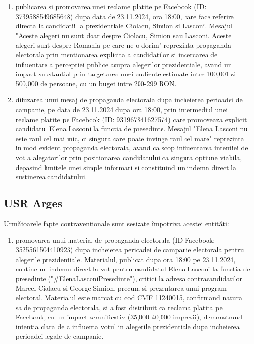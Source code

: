 \documentclass[a4paper,12pt]{article}
\begin{document}
\begin{enumerate}[leftmargin=*, label=\arabic*.)]
    \item publicarea si promovarea unei reclame platite pe Facebook (ID: \href{https://www.facebook.com/ads/library/?id=3739588549685648}{3739588549685648}) dupa data de 23.11.2024, ora 18:00, care face referire directa la candidatii la prezidentiale Ciolacu, Simion si Lasconi. Mesajul "Aceste alegeri nu sunt doar despre Ciolacu, Simion sau Lasconi. Aceste alegeri sunt despre Romania pe care ne-o dorim" reprezinta propaganda electorala prin mentionarea explicita a candidatilor si incercarea de influentare a perceptiei publice asupra alegerilor prezidentiale, avand un impact substantial prin targetarea unei audiente estimate intre 100,001 si 500,000 de persoane, cu un buget intre 200-299 RON.
    \item difuzarea unui mesaj de propaganda electorala dupa incheierea perioadei de campanie, pe data de 23.11.2024 dupa ora 18:00, prin intermediul unei reclame platite pe Facebook (ID: \href{https://www.facebook.com/ads/library/?id=931967841627574}{931967841627574}) care promoveaza explicit candidatul Elena Lasconi la functia de presedinte. Mesajul "Elena Lasconi nu este raul cel mai mic, ci singura care poate invinge raul cel mare" reprezinta in mod evident propaganda electorala, avand ca scop influentarea intentiei de vot a alegatorilor prin pozitionarea candidatului ca singura optiune viabila, depasind limitele unei simple informari si constituind un indemn direct la sustinerea candidatului.
\end{enumerate}

\vspace{0.5cm}

\subsection{USR Arges}
Următoarele fapte contravenționale sunt sesizate împotriva acestei entități:

\begin{enumerate}[leftmargin=*, label=\arabic*.)]
    \item promovarea unui material de propaganda electorala (ID Facebook: \href{https://www.facebook.com/ads/library/?id=3525561504410923}{3525561504410923}) dupa incheierea perioadei de campanie electorala pentru alegerile prezidentiale. Materialul, publicat dupa ora 18:00 pe 23.11.2024, contine un indemn direct la vot pentru candidatul Elena Lasconi la functia de presedinte ("\#ElenaLasconiPresedinte"), critici la adresa contracandidatilor Marcel Ciolacu si George Simion, precum si prezentarea unui program electoral. Materialul este marcat cu cod CMF 11240015, confirmand natura sa de propaganda electorala, si a fost distribuit ca reclama platita pe Facebook, cu un impact semnificativ (35,000-40,000 impresii), demonstrand intentia clara de a influenta votul in alegerile prezidentiale dupa incheierea perioadei legale de campanie.
\end{enumerate}
\end{document}
